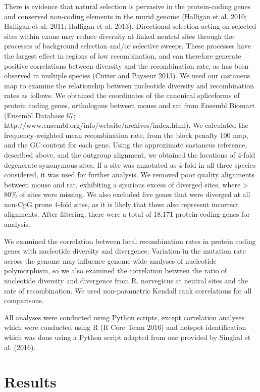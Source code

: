 There is evidence that natural selection is pervasive in the protein-coding genes and conserved non-coding elements in the murid genome (Halligan et al. 2010; Halligan et al. 2011; Halligan et al. 2013). Directional selection acting on selected sites within exons may reduce diversity at linked neutral sites through the processes of background selection and/or selective sweeps. These processes have the largest effect in regions of low recombination, and can therefore generate positive correlations between diversity and the recombination rate, as has been observed in multiple species (Cutter and Payseur 2013). We used our castaneus map to examine the relationship between nucleotide diversity and recombination rates as follows. We obtained the coordinates of the canonical spliceforms of protein coding genes, orthologous between mouse and rat from Ensembl Biomart (Ensembl Database 67; http://www.ensembl.org/info/website/archives/index.html). We calculated the frequency-weighted mean recombination rate, from the block penalty 100 map, and the GC content for each gene. Using the approximate castaneus reference, described above, and the outgroup alignment, we obtained the locations of 4-fold degenerate synonymous sites. If a site was annotated as 4-fold in all three species considered, it was used for further analysis. We removed poor quality alignments between mouse and rat, exhibiting a spurious excess of diverged sites, where > 80\% of sites were missing. We also excluded five genes that were diverged at all non-CpG prone 4-fold sites, as it is likely that these also represent incorrect alignments. After filtering, there were a total of 18,171 protein-coding genes for analysis.

We examined the correlation between local recombination rates in protein coding genes with nucleotide diversity and divergence. Variation in the mutation rate across the genome may influence genome-wide analyses of nucleotide polymorphism, so we also examined the correlation between the ratio of nucleotide diversity and divergence from R. norvegicus at neutral sites and the rate of recombination. We used non-parametric Kendall rank correlations for all comparisons.

All analyses were conducted using Python scripts, except correlation analyses which were conducted using R (R Core Team 2016) and hotspot identification which was done using a Python script adapted from one provided by Singhal et al. (2016). 

\section{Results}
 
